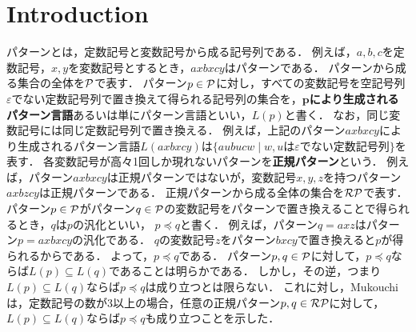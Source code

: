 \section{Introduction}

パターンとは，定数記号と変数記号から成る記号列である．
例えば，$a,b,c$を定数記号，$x,y$を変数記号とするとき，$axbxcy$はパターンである．
パターンから成る集合の全体を$\mathcal P$で表す．
パターン$p\in \mathcal P$に対し，すべての変数記号を空記号列$\varepsilon$でない定数記号列で置き換えて得られる記号列の集合を，\textbf{$\bm{p}$により生成されるパターン言語}あるいは単にパターン言語といい，$L(p)$と書く．
なお，同じ変数記号には同じ定数記号列で置き換える．
例えば，上記のパターン$axbxcy$により生成されるパターン言語$L(axbxcy)$は$\{ aubucw \mid w,u\mbox{は$\varepsilon$でない定数記号列} \}$を表す．
各変数記号が高々1回しか現れないパターンを\textbf{正規パターン}という．
例えば，パターン$axbxcy$は正規パターンではないが，変数記号$x,y,z$を持つパターン$axbzcy$は正規パターンである．
正規パターンから成る全体の集合を$\mathcal{RP}$で表す．
パターン$p\in \mathcal P$がパターン$q\in\mathcal P$の変数記号をパターンで置き換えることで得られるとき，$q$は$p$の汎化といい，
$p\preceq q$と書く．
例えば，パターン$q=axz$はパターン$p=axbxcy$の汎化である．
$q$の変数記号$z$をパターン$bxcy$で置き換えると$p$が得られるからである．
よって，$p\preceq q$である．
パターン$p,q\in \mathcal P$に対して，$p\preceq q$ならば$L(p)\subseteq L(q)$であることは明らかである．
しかし，その逆，つまり$L(p)\subseteq L(q)$ならば$p\preceq q$は成り立つとは限らない．
これに対し，Mukouchi\cite{Mukouchi1991}は，定数記号の数が3以上の場合，任意の正規パターン$p,q\in \mathcal{RP}$に対して，
$L(p)\subseteq L(q)$ならば$p\preceq q$も成り立つことを示した．


